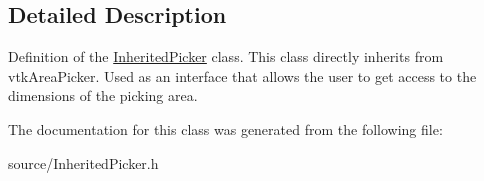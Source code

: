 \subsection{Detailed Description}
Definition of the \hyperlink{class_inherited_picker}{Inherited\+Picker} class. This class directly inherits from vtk\+Area\+Picker. Used as an interface that allows the user to get access to the dimensions of the picking area. 

The documentation for this class was generated from the following file\+:\begin{DoxyCompactItemize}
\item 
source/Inherited\+Picker.\+h\end{DoxyCompactItemize}
